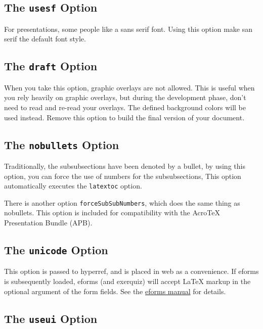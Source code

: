 \documentclass{article}
\def\AcroT{Acro\!\TeX}\def\cAcroT{\textcolor{blue}{\AcroT}}
\def\Web{\textsf{web}}
\let\pkg\textsf
\begin{document}
{\subsection{The \texttt{usesf} Option}\label{usesf}

For presentations, some people like a sans serif font. Using this option
make san serif the default font style.

\subsection{The \texttt{draft} Option}\label{draft}

When you take this option, graphic overlays are not allowed.  This
is useful when you rely heavily on graphic overlays, but during the
development phase, don't need to read and re-read your overlays. The
defined background colors will be used instead. Remove this option
to build the final version of your document.


\subsection{The \texttt{nobullets} Option}\label{nobullets}

Traditionally, the subsubsections have been denoted by a bullet, by
using this option, you can force the use of numbers for the
subsubsections, This option automatically executes the
\texttt{latextoc} option.

There is another option \texttt{forceSubSubNumbers}, which does the same thing
as nobullets. This option is included for compatibility with the {\AcroT}
Presentation Bundle (\textsf{APB}).

\subsection{The \texttt{unicode} Option}\label{web:unicode}

This option is passed to \pkg{hyperref}, and is placed in {\Web} as a
convenience. If \textsf{eforms} is subsequently loaded, \textsf{eforms} (and
\textsf{exerquiz}) will accept {\LaTeX} markup in the optional argument
of the form fields. See the \href{eformman.pdf}{eforms manual}
for details.

\subsection{The \texttt{useui} Option}\label{web:useui}

}
\end{document}
